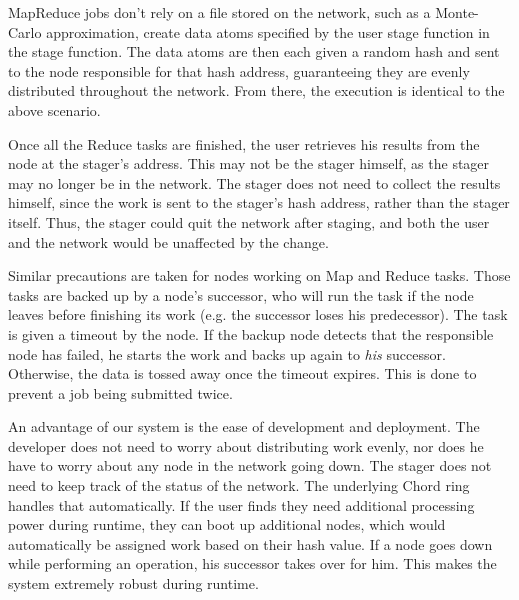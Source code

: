 MapReduce jobs don't rely on a file stored on the network, such as a Monte-Carlo approximation, create data atoms specified by the user stage function in the stage function.  The data atoms are then each given a random hash and sent to the node responsible for that hash address, guaranteeing they are evenly distributed throughout the network. From there, the execution is identical to the above scenario.



Once all the Reduce tasks are finished, the user retrieves his results from the node at the stager's address.  This may not be the stager himself, as the stager may no longer be in the network.  The stager does not need to collect the results himself, since the work is sent to the stager's hash address, rather than the stager itself.  Thus, the stager could quit the network after staging, and both the user and the network would be unaffected by the change. %

Similar precautions are taken for nodes working on Map and Reduce tasks.  Those tasks are backed up by a node's successor, who will run the task if the node leaves before finishing its work (e.g. the successor loses his predecessor).   The task is given a timeout by the node.  If the backup node detects that the responsible node has failed, he starts the work and backs up again to \emph{his} successor.  Otherwise, the data is tossed away once the timeout expires. This is done to prevent a job being submitted twice.

An advantage of our system is the ease of development and deployment.  The developer does not need to worry about distributing work evenly, nor does he have to worry about any node in the network going down.  The stager does not need to keep track of the status of the network.  The underlying Chord ring handles that automatically.  If the user finds they need additional processing power during runtime, they can boot up additional nodes, which would automatically be assigned work based on their hash value.   If a node goes down while performing an operation, his successor takes over for him.  This makes the system extremely robust during runtime.

